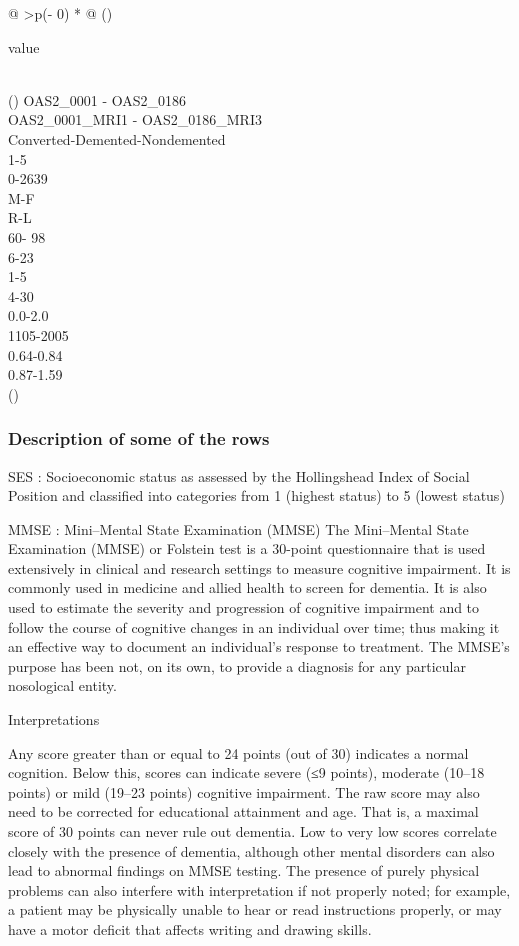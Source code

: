\documentclass[
]{article}
\begin{document}
\begin{longtable}[]{@{}
  >{\centering\arraybackslash}p{(\columnwidth - 0\tabcolsep) * }@{}}
\toprule()
\begin{minipage}[b]{\linewidth}\centering
value
\end{minipage} \\
\midrule()
\endhead
OAS2\_0001 - OAS2\_0186 \\
OAS2\_0001\_MRI1 - OAS2\_0186\_MRI3 \\
Converted-Demented-Nondemented \\
1-5 \\
0-2639 \\
M-F \\
R-L \\
60- 98 \\
6-23 \\
1-5 \\
4-30 \\
0.0-2.0 \\
1105-2005 \\
0.64-0.84 \\
0.87-1.59 \\
\bottomrule()
\end{longtable}

\hypertarget{description-of-some-of-the-rows}{%
\subsubsection{Description of some of the
rows}\label{description-of-some-of-the-rows}}

SES : Socioeconomic status as assessed by the Hollingshead Index of
Social Position and classified into categories from 1 (highest status)
to 5 (lowest status)

MMSE : Mini--Mental State Examination (MMSE) The Mini--Mental State
Examination (MMSE) or Folstein test is a 30-point questionnaire that is
used extensively in clinical and research settings to measure cognitive
impairment. It is commonly used in medicine and allied health to screen
for dementia. It is also used to estimate the severity and progression
of cognitive impairment and to follow the course of cognitive changes in
an individual over time; thus making it an effective way to document an
individual's response to treatment. The MMSE's purpose has been not, on
its own, to provide a diagnosis for any particular nosological entity.

Interpretations

Any score greater than or equal to 24 points (out of 30) indicates a
normal cognition. Below this, scores can indicate severe (≤9 points),
moderate (10--18 points) or mild (19--23 points) cognitive impairment.
The raw score may also need to be corrected for educational attainment
and age. That is, a maximal score of 30 points can never rule out
dementia. Low to very low scores correlate closely with the presence of
dementia, although other mental disorders can also lead to abnormal
findings on MMSE testing. The presence of purely physical problems can
also interfere with interpretation if not properly noted; for example, a
patient may be physically unable to hear or read instructions properly,
or may have a motor deficit that affects writing and drawing skills.
\end{document}
